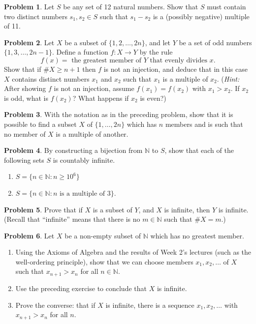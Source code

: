 \documentclass{article}
\numberwithin{equation}{section}
\theoremstyle{plain}
\theoremstyle{definition}
\newtheorem{problem}{Problem}
\newcommand{\N}{\mathbb N}
\begin{document}
\begin{problem}
	Let $S$ be any set of 12 natural numbers. Show that $S$ must contain two distinct numbers $s_1, s_2 \in S$ such that $s_1 - s_2$ is a (possibly negative) multiple of 11. 
\end{problem}

\begin{problem}
Let $X$ be a subset of $\{1, 2, \ldots, 2n\}$, and let $Y$ be a set of odd numbers $\{1, 3, \ldots, 2n-1\}$. Define a function $f : X \to Y$ by the rule 
\[
f(x) = \textrm{ the greatest member of $Y$ that evenly divides $x$}.
\]
Show that if $\#X \geq n+1$ then $f$ is not an injection, and deduce that in this case $X$ contains distinct numbers $x_1$ and $x_2$ such that $x_1$ is a multiple of $x_2$. (\emph{Hint:} After showing $f$ is not an injection, assume $f(x_1) = f(x_2)$ with $x_1 > x_2$. If $x_2$ is odd, what is $f(x_2)$? What happens if $x_2$ is even?)
\end{problem}

\begin{problem}
	With the notation as in the preceding problem, show that it is possible to find a subset $X$ of $\{1, \ldots, 2n\}$ which has $n$ members and is such that no member of $X$ is a multiple of another. 
\end{problem}

\begin{problem}
	By constructing a bijection from $\N$ to $S$, show that each of the following sets $S$ is countably infinite. 
	\begin{enumerate}[label=(\alph*)]
		\item $S = \{n \in \N : n \geq 10^6\}$ 
		\item $S = \{n \in \N: n \textrm{ is a multiple of 3}\}$. 
	\end{enumerate}
\end{problem}

\begin{problem}
	Prove that if $X$ is a subset of $Y$, and $X$ is infinite, then $Y$ is infinite. (Recall that ``infinite'' means that there is no $m \in \N$ such that $\#X = m$.)
\end{problem}

\begin{problem}
	Let $X$ be a non-empty subset of $\N$ which has no greatest member. 
	\begin{enumerate}[label=(\alph*)] 
		\item Using the Axioms of Algebra and the results of Week 2's lectures (such as the well-ordering principle), show that we can choose members $x_1, x_2, \ldots$ of $X$ such that $x_{n+1} > x_n$ for all $n \in \N$. 
		\item Use the preceding exercise to conclude that $X$ is infinite. 
		\item Prove the converse: that if $X$ is infinite, there is a sequence $x_1, x_2, \ldots$ with $x_{n+1} > x_n$ for all $n$. 
	\end{enumerate}
\end{problem}
\end{document}
